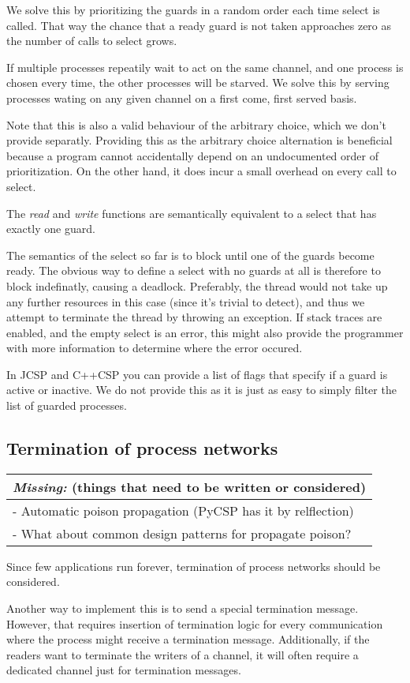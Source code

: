 \documentclass[a4paper,12pt]{article}
\newcommand{\missing}[1]{
  \begin{tabular}{|p{11cm}|}
    \hline
    \emph{Missing:} {\scriptsize (things that need to be written or considered)} \\
    \hline
    #1
    \hline
  \end{tabular}
}
\begin{document}
We solve this by prioritizing the guards in a random order each time select is called. That way the
chance that a ready guard is not taken approaches zero as the number of calls to select grows.

If multiple processes repeatily wait to act on the same channel, and one process is chosen every time,
the other processes will be starved. We solve this by serving processes wating on any given channel
on a first come, first served basis.

Note that this is also a valid behaviour of the arbitrary choice, which we don't
provide separatly. Providing this as the arbitrary choice alternation is
beneficial because a program cannot accidentally depend on an undocumented
order of prioritization. On the other hand, it does incur a small overhead on
every call to select.

The \emph{read} and \emph{write} functions are semantically equivalent to a select that has exactly 
one guard.

The semantics of the select so far is to block until one of the guards become ready. The obvious
way to define a select with no guards at all is therefore to block indefinatly, causing a deadlock.
Preferably, the thread would not take up any further resources in this case (since it's trivial to 
detect), and thus we attempt to terminate the thread by throwing an exception. If stack traces are
enabled, and the empty select is an error, this might also provide the programmer with more information
to determine where the error occured.

In JCSP and C++CSP you can provide a list of flags that specify if a guard is
active or inactive. We do not provide this as it is just as easy to simply
filter the list of guarded processes.

\subsection{Termination of process networks}
\missing{
- Automatic poison propagation (PyCSP has it by relflection)\\
- What about common design patterns for propagate poison?\\
}

Since few applications run forever, termination of process networks should be
considered.

Another way to implement this is to send a special termination message. However,
that requires insertion of termination logic for every communication where the
process might receive a termination message. Additionally, if the readers want
to terminate the writers of a channel, it will often require a dedicated channel
just for termination messages.
\end{document}
